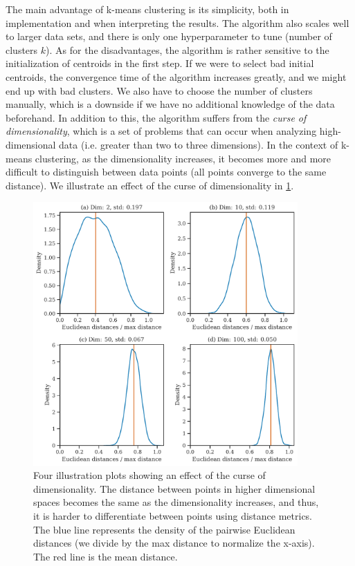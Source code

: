 The main advantage of k-means clustering is its simplicity, both in implementation and when interpreting the results. The algorithm also scales well to larger data sets, and there is only one hyperparameter to tune (number of clusters $k$). As for the disadvantages, the algorithm is rather sensitive to the initialization of centroids in the first step. If we were to select bad initial centroids, the convergence time of the algorithm increases greatly, and we might end up with bad clusters. We also have to choose the number of clusters manually, which is a downside if we have no additional knowledge of the data beforehand. In addition to this, the algorithm suffers from the \textit{curse of dimensionality}, which is a set of problems that can occur when analyzing high-dimensional data (i.e. greater than two to three dimensions). In the context of k-means clustering, as the dimensionality increases, it becomes more and more difficult to distinguish between data points (all points converge to the same distance). We illustrate an effect of the curse of dimensionality in \cref{fig:curse-of-dimensionality}.
\begin{figure}[H]
    \centering
    \includegraphics[width=0.9\textwidth]{thesis/figures/curse-of-dimensionality.pdf}
    \caption{Four illustration plots showing an effect of the curse of dimensionality. The distance between points in higher dimensional spaces becomes the same as the dimensionality increases, and thus, it is harder to differentiate between points using distance metrics. The blue line represents the density of the pairwise Euclidean distances (we divide by the max distance to normalize the x-axis). The red line is the mean distance.}
    \label{fig:curse-of-dimensionality}
\end{figure}

